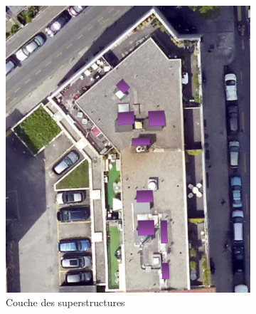 \begin{figure}[H]
    \begin{subfigure}[b]{0.48\textwidth}
        \centering
        \includegraphics[width=\textwidth]{02-main/figures/ch3/ch3_piste_exploree_classification_10_resultats_image_sp.png}
        \caption{Couche des superstructures}
        \label{fig:ch3_piste_exploree_classification_10_resultats_image_sp}
    \end{subfigure}
    \hfill
    \begin{subfigure}[b]{0.475\textwidth}
        \centering

\end{subfigure}
\end{figure}
